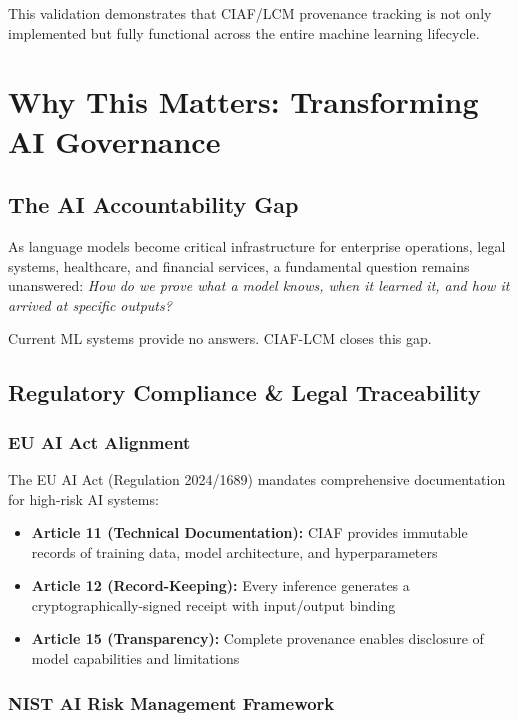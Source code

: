 \documentclass[11pt,a4paper]{article}
\begin{document}
This validation demonstrates that CIAF/LCM provenance tracking is not only implemented but fully functional across the entire machine learning lifecycle.

\section{Why This Matters: Transforming AI Governance}

\subsection{The AI Accountability Gap}

As language models become critical infrastructure for enterprise operations, legal systems, healthcare, and financial services, a fundamental question remains unanswered: \textit{How do we prove what a model knows, when it learned it, and how it arrived at specific outputs?}

Current ML systems provide no answers. CIAF-LCM closes this gap.

\subsection{Regulatory Compliance \& Legal Traceability}

\subsubsection{EU AI Act Alignment}

The EU AI Act (Regulation 2024/1689) mandates comprehensive documentation for high-risk AI systems:

\begin{itemize}
    \item \textbf{Article 11 (Technical Documentation):} CIAF provides immutable records of training data, model architecture, and hyperparameters
    \item \textbf{Article 12 (Record-Keeping):} Every inference generates a cryptographically-signed receipt with input/output binding
    \item \textbf{Article 15 (Transparency):} Complete provenance enables disclosure of model capabilities and limitations
\end{itemize}

\subsubsection{NIST AI Risk Management Framework}
\end{document}
